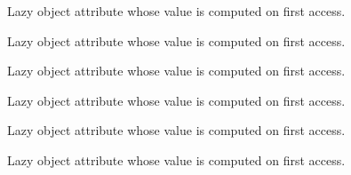 \documentclass[letterpaper,10pt,english]{sphinxmanual}
\begin{document}
\begin{fulllineitems}
\begin{fulllineitems}
\end{fulllineitems}


\begin{fulllineitems}
\label{tifffile:tifffile.TiffFile.is_mdgel}
Lazy object attribute whose value is computed on first access.

\end{fulllineitems}


\begin{fulllineitems}
\label{tifffile:tifffile.TiffFile.is_mediacy}
Lazy object attribute whose value is computed on first access.

\end{fulllineitems}


\begin{fulllineitems}
\label{tifffile:tifffile.TiffFile.is_micromanager}
Lazy object attribute whose value is computed on first access.

\end{fulllineitems}


\begin{fulllineitems}
\label{tifffile:tifffile.TiffFile.is_nih}
Lazy object attribute whose value is computed on first access.

\end{fulllineitems}


\begin{fulllineitems}
\label{tifffile:tifffile.TiffFile.is_ome}
Lazy object attribute whose value is computed on first access.

\end{fulllineitems}


\begin{fulllineitems}
\label{tifffile:tifffile.TiffFile.is_palette}
Lazy object attribute whose value is computed on first access.


\end{fulllineitems}
\end{fulllineitems}
\end{document}
